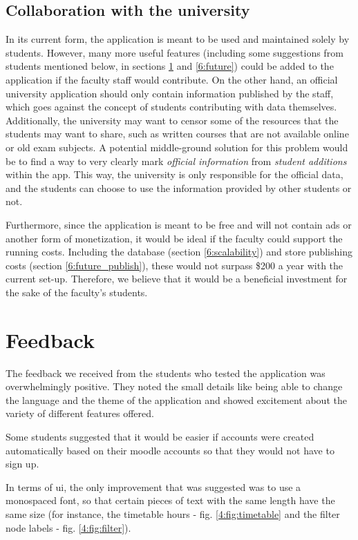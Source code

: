 \subsection{Collaboration with the university}
In its current form, the application is meant to be used and maintained solely by students. However, many more useful features (including some suggestions from students mentioned below, in sections \ref{6:feedback} and \ref{6:future}) could be added to the application if the faculty staff would contribute. On the other hand, an official university application should only contain information published by the staff, which goes against the concept of students contributing with data themselves. Additionally, the university may want to censor some of the resources that the students may want to share, such as written courses that are not available online or old exam subjects. A potential middle-ground solution for this problem would be to find a way to very clearly mark \textit{official information} from \textit{student additions} within the app. This way, the university is only responsible for the official data, and the students can choose to use the information provided by other students or not.

Furthermore, since the application is meant to be free and will not contain ads or another form of monetization, it would be ideal if the faculty could support the running costs. Including the database (section \ref{6:scalability}) and store publishing costs (section \ref{6:future_publish}), these would not surpass \$200 a year with the current set-up. Therefore, we believe that it would be a beneficial investment for the sake of the faculty's students.

\section{Feedback} \label{6:feedback}
The feedback we received from the students who tested the application was overwhelmingly positive. They noted the small details like being able to change the language and the theme of the application and showed excitement about the variety of different features offered.

Some students suggested that it would be easier if accounts were created automatically based on their \gls{moodle} accounts so that they would not have to sign up.

In terms of \acrshort{ui}, the only improvement that was suggested was to use a monospaced font, so that certain pieces of text with the same length have the same size (for instance, the timetable hours - fig. \ref{4:fig:timetable} and the filter node labels - fig. \ref{4:fig:filter}).

